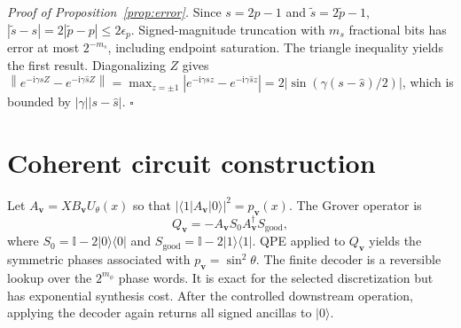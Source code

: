 \documentclass[a4paper,twocolumn,11pt,unpublished]{quantumarticle}
\newcommand{\ii}{\mathrm{i}}
\newcommand{\Id}{\mathbb{I}}
\newcommand{\ket}[1]{|#1\rangle}
\newcommand{\bra}[1]{\langle #1|}
\newcommand{\axis}{\boldsymbol{v}}
\newcommand{\norm}[1]{\left\lVert #1\right\rVert}
\begin{document}
\textit{Proof of Proposition~\ref{prop:error}.}
Since $s=2p-1$ and $\widetilde s=2\widetilde p-1$,
$|\widetilde s-s|=2|\widetilde p-p|\leq2\epsilon_p$. Signed-magnitude truncation with $m_s$ fractional bits has error at most $2^{-m_s}$, including endpoint saturation. The triangle inequality yields the first result. Diagonalizing $Z$ gives
$\norm{e^{-\ii\gamma sZ}-e^{-\ii\gamma\widehat sZ}}=\max_{z=\pm1}|e^{-\ii\gamma sz}-e^{-\ii\gamma\widehat sz}|=2|\sin(\gamma(s-\widehat s)/2)|$, which is bounded by $|\gamma||s-\widehat s|$. \hfill$\square$

\section{Coherent circuit construction}\label{app:circuit}

Let $A_{\axis}=XB_{\axis}U_\theta(x)$ so that $|\langle1|A_{\axis}|0\rangle|^2=p_{\axis}(x)$. The Grover operator is
\begin{equation}
Q_{\axis}=-A_{\axis}S_0A_{\axis}^{\dagger}S_{\mathrm{good}},
\end{equation}
where $S_0=\Id-2\ket{0}\!\bra{0}$ and $S_{\mathrm{good}}=\Id-2\ket{1}\!\bra{1}$. QPE applied to $Q_{\axis}$ yields the symmetric phases associated with $p_{\axis}=\sin^2\theta$. The finite decoder is a reversible lookup over the $2^{m_\phi}$ phase words. It is exact for the selected discretization but has exponential synthesis cost. After the controlled downstream operation, applying the decoder again returns all signed ancillas to $\ket{0}$.



\end{document}
